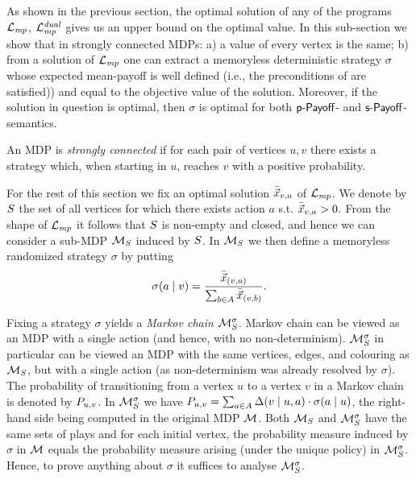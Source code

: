 As shown in the previous section, the optimal solution of any of the programs $\mathcal{L}_{\mathit{mp}}$, $\mathcal{L}_{\mathit{mp}}^{\mathit{dual}}$ gives us an upper bound on the optimal value. In this sub-section we show that in strongly connected MDPs: a) a value of every vertex is the same; b) from a solution of $\mathcal{L}_{\mathit{mp}}$ one can extract a memoryless deterministic strategy $\sigma$ whose expected mean-payoff is well defined (i.e., the preconditions of  are satisfied)) and equal to the objective value of the solution. Moreover, if the solution in question is optimal, then $ \sigma $ is optimal for both $\textsf{p-Payoff}$- and $\textsf{s-Payoff}$-semantics.

\begin{definition}
\label{5-def:scc-mdp}
An MDP is \emph{strongly connected} if for each pair of vertices $u,v$ there exists a strategy which, when starting in $u$, reaches $v$ with a positive probability. 
\end{definition}

For the rest of this section we fix an optimal solution $\bar{\vec{x}}_{v,a}$ of $\mathcal{L}_{\mathit{mp}}$. We denote by $S$ the set of all vertices for which there exists action $a$ s.t. $\bar{\vec{x}}_{v,a}>0.$ From the shape of $\mathcal{L}_{\mathit{mp}}$ it follows that $S$ is non-empty and closed, and hence we can consider a sub-MDP $\mathcal{M}_{S}$ induced by $S$. In $\mathcal{M}_{S}$ we then define a memoryless randomized strategy $\sigma$ by putting $$\sigma(a\mid v)=\frac{\bar{\vec{x}}_{(v,a)}}{\sum_{b\in A}\bar{\vec{x}}_{(v,b)}}.$$

Fixing a strategy $\sigma$ yields a \emph{Markov chain} $\mathcal{M}_S^{\sigma}$. Markov chain can be viewed as an MDP with a single action (and hence, with no non-determinism). $\mathcal{M}_{S}^\sigma$ in particular can be viewed an MDP with the same vertices, edges, and colouring as $\mathcal{M}_S$, but with a single action (as non-determinism was already resolved by $\sigma$). The probability of transitioning from a vertex $u$ to a vertex $v$ in a Markov chain is denoted by $P_{u,v}$. In $\mathcal{M}_{S}^{\sigma}$ we have $P_{u,v}=\sum_{a\in A} \Delta(v\mid u,a)\cdot\sigma(a\mid u)$, the right-hand side being computed in the original MDP $\mathcal{M}$. Both $\mathcal{M}_S$ and $\mathcal{M}_{S}^{\sigma}$ have the same sets of plays and for each initial vertex, the probability measure induced by $\sigma$ in $\mathcal{M}$ equals the probability measure arising (under the unique policy) in $\mathcal{M}_{S}^{\sigma}$. Hence, to prove anything about $\sigma$ it suffices to analyse $\mathcal{M}_{S}^{\sigma}$.

